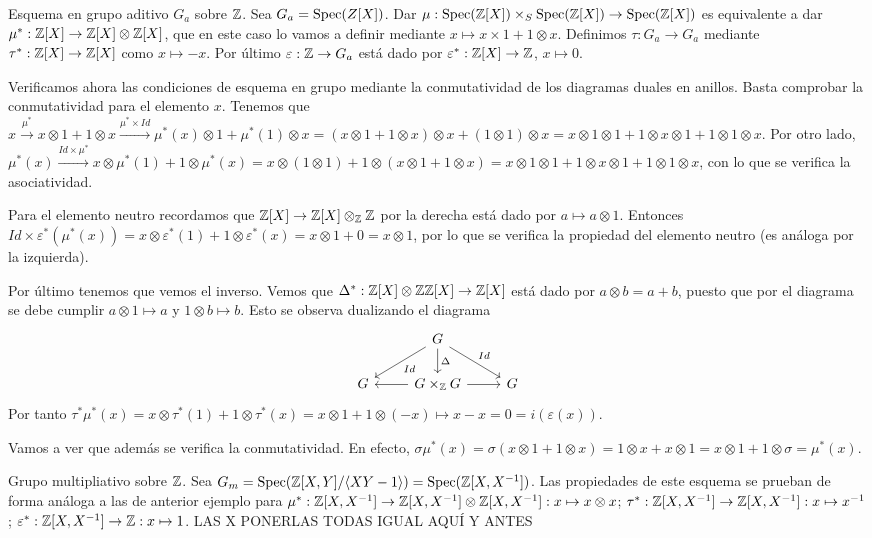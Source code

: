 \documentclass[GA.tex]{subfiles}
\begin{document}
\begin{ej}
Esquema en grupo aditivo $G_a$ sobre $\mathbb{Z}$. Sea $G_a=\operatorname{Spec}(Z[X])$. Dar $\mu:\operatorname{Spec}(\mathbb{Z}[X])\times_S\operatorname{Spec}(\mathbb{Z}[X])\to\operatorname{Spec}(\mathbb{Z}[X])$ es equivalente a dar $\mu^*:\mathbb{Z}[X]\to \mathbb{Z}[X]\otimes\mathbb{Z}[X]$, que en este caso lo vamos a definir mediante $x\mapsto x\times 1+1\otimes x$. Definimos $\tau:G_a\to G_a$ mediante $\tau^*:\mathbb{Z}[X]\to\mathbb{Z}[X]$ como $x\mapsto -x$. Por último $\varepsilon:\mathbb{Z}\to G_a$ está dado por $\varepsilon^*:\mathbb{Z}[X]\to\mathbb{Z}$, $x\mapsto 0$. 

Verificamos ahora las condiciones de esquema en grupo mediante la conmutatividad de los diagramas duales en anillos. Basta comprobar la conmutatividad para el elemento $x$. Tenemos que $x\xrightarrow{\mu^*}x\otimes 1+1\otimes x\xrightarrow{\mu^*\times Id} \mu^*(x)\otimes 1+\mu^*(1)\otimes x=(x\otimes 1+1\otimes x)\otimes x+(1\otimes 1)\otimes x=x\otimes 1\otimes 1+1\otimes x\otimes 1+1\otimes 1\otimes x$. Por otro lado, $\mu^*(x)\xrightarrow{Id\times\mu^*} x\otimes\mu^*(1)+1\otimes\mu^*(x)=x\otimes(1\otimes 1)+1\otimes(x\otimes 1+1\otimes x)=x\otimes 1\otimes 1+ 1\otimes x\otimes 1+1\otimes 1\otimes x$, con lo que se verifica la asociatividad. 

Para el elemento neutro recordamos que $\mathbb{Z}[X]\to\mathbb{Z}[X]\otimes_{\mathbb{Z}}\mathbb{Z}$ por la derecha está dado por $a\mapsto a\otimes 1$. Entonces $Id\times\varepsilon^*(\mu^*(x))=x\otimes \varepsilon^*(1)+1\otimes\varepsilon^*(x)=x\otimes 1+0=x\otimes 1$, por lo que se verifica la propiedad del elemento neutro (es análoga por la izquierda).

Por último tenemos que vemos el inverso. Vemos que $\Delta^*:\mathbb{Z}[X]\otimes\mathbb{Z}\mathbb{Z}[X]\to \mathbb{Z}[X]$ está dado por $a\otimes b=a+b$, puesto que por el diagrama se debe cumplir $a\otimes 1\mapsto a$ y $1\otimes b\mapsto b$. Esto se observa dualizando el diagrama
\[
\begin{tikzcd}
& G\arrow[ld, "Id"] \arrow[rd, "Id"]\arrow[d, "\Delta"] & \\
G & G\times_\Z G\arrow[l]\arrow[r] & G
\end{tikzcd}
\]
Por tanto $\tau^*\mu^*(x)=x\otimes\tau^*(1)+1\otimes\tau^*(x)=x\otimes 1+1\otimes(-x)\mapsto x-x=0=i(\varepsilon(x))$. 

Vamos a ver que además se verifica la conmutatividad. En efecto, $\sigma\mu^*(x)=\sigma(x\otimes 1+1\otimes x)=1\otimes x+x\otimes 1=x\otimes 1+1\otimes \sigma=\mu^*(x)$. 
\end{ej}

\begin{ej}
Grupo multipliativo sobre $\mathbb{Z}$. Sea $G_m=\operatorname{Spec}(\mathbb{Z}[X,Y]/\langle{XY-1}\rangle)=\operatorname{Spec}(\mathbb{Z}[X,X^{-1}])$. Las propiedades de este esquema se prueban de forma análoga a las de anterior ejemplo para $\mu^*:\mathbb{Z}[X,X^{-1}]\to\mathbb{Z}[X,X^{-1}]\otimes \mathbb{Z}[X,X^{-1}]: x\mapsto x\otimes x$; $\tau^*:\mathbb{Z}[X,X^{-1}]\to \mathbb{Z}[X,X^{-1}]: x\mapsto x^{-1}$; $\varepsilon^*:\mathbb{Z}[X,X^{-1}]\to\mathbb{Z}: x\mapsto 1$. LAS X PONERLAS TODAS IGUAL AQUÍ Y ANTES
\end{ej}
\end{document}
